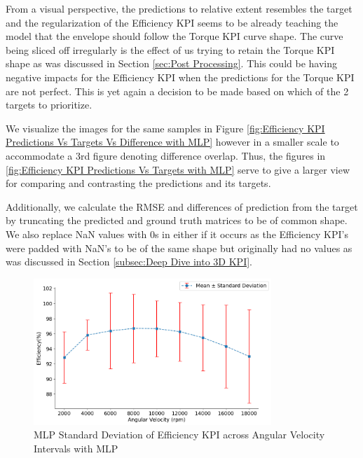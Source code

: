 \documentclass{report} %
\begin{document}
From a visual perspective, the predictions to relative extent resembles the target and the regularization of the Efficiency \ac{KPI} seems to be already teaching 
the model that the envelope should follow the Torque \ac{KPI} curve shape.  
The curve being sliced off irregularly is the effect of us trying to retain the Torque \ac{KPI} shape as was discussed in Section \ref{sec:Post Processing}.
This could be having negative impacts for the Efficiency \ac{KPI}  when the predictions for the Torque \ac{KPI} are not perfect.
This is yet again a decision to be made based on which of the 2 targets to prioritize. 

We visualize the images for the same samples in Figure \ref{fig:Efficiency KPI Predictions Vs Targets Vs Difference with MLP} however in a smaller scale to accommodate 
a 3rd figure denoting difference overlap. Thus, the figures in \ref{fig:Efficiency KPI Predictions Vs Targets with MLP} serve to give a larger view for comparing and 
contrasting the predictions and its targets.

Additionally, we calculate the \ac{RMSE} and differences of prediction from the target by truncating the predicted and ground truth matrices to be of common shape.
We also replace \ac{NaN} values with 0s in either if it occurs as the Efficiency \ac{KPI}'s were padded with \ac{NaN}'s to be of the same shape but originally 
had no values as was discussed in Section \ref{subsec:Deep Dive into 3D KPI}.

\begin{figure}[H]
    \centering
    \includegraphics[width=0.8\textwidth]{./ReportImages/stddev_y2_nn_MLP.png} 
    \caption{\ac{MLP} Standard Deviation of Efficiency \ac{KPI} across Angular Velocity Intervals with \ac{MLP}} 
    \label{fig:MLP Standard Deviation of 3D KPI(Efficiency) across Angular Velocity Intervals with MLP}
\end{figure}
\end{document}
